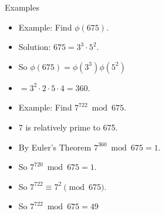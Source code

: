 \documentclass{beamer}
\begin{document}
\begin{frame}{Examples}

\begin{itemize}
  \item Example: Find $\phi(675)$.
  \item Solution: $675 = 3^3 \cdot 5^2$.
  \item So $\phi(675) = \phi(3^3)\phi(5^2)$
  \item $=3^2\cdot 2 \cdot 5 \cdot 4 = 360$.
  \item Example: Find $7^{722} \bmod 675$.
  \item 7 is relatively prime to 675.
  \item By Euler's Theorem $7^{360} \bmod 675 = 1$.
  \item So $7^{720} \bmod 675 = 1$.
  \item So $7^{722} \equiv 7^2 \pmod {675}$.
  \item So $7^{722} \bmod 675 = 49$
\end{itemize}

\end{frame}
\end{document}
